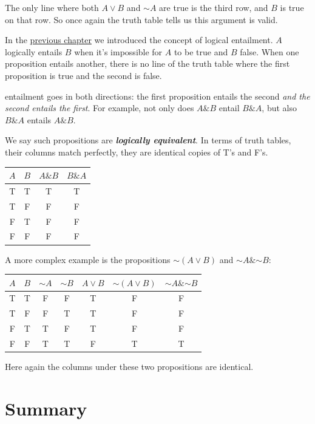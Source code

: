\documentclass[justified]{tufte-book}
\renewcommand{\neg}{\mathbin{\sim}}
\renewcommand{\wedge}{\mathbin{\&}}
\theoremstyle{definition}
\theoremstyle{definition}
\theoremstyle{definition}
\theoremstyle{definition}
\theoremstyle{remark}
\begin{document}
The only line where both \(A \vee B\) and \(\neg A\) are true is the third row, and \(B\) is true on that row. So once again the truth table tells us this argument is valid.

In the \protect\hyperlink{visualizing-propositions}{previous chapter} we introduced the concept of logical entailment. \(A\) logically entails \(B\) when it's impossible for \(A\) to be true and \(B\) false. When one proposition entails another, there is no line of the truth table where the first proposition is true and the second is false.

 entailment goes in both directions: the first proposition entails the second \emph{and the second entails the first}. For example, not only does \(A \wedge B\) entail \(B \wedge A\), but also \(B \wedge A\) entails \(A \wedge B\).

We say such propositions are \textbf{\emph{logically equivalent}}. In terms of truth tables, their columns match perfectly, they are identical copies of T's and F's.

\begin{longtable}[]{@{}cccc@{}}
\toprule
\(A\) & \(B\) & \(A \wedge B\) & \(B \wedge A\) \\
\midrule
\endhead
T & T & T & T \\
T & F & F & F \\
F & T & F & F \\
F & F & F & F \\
\bottomrule
\end{longtable}

A more complex example is the propositions \(\neg (A \vee B)\) and \(\neg A \wedge \neg B\):

\begin{longtable}[]{@{}ccccccc@{}}
\toprule
\(A\) & \(B\) & \(\neg A\) & \(\neg B\) & \(A \vee B\) & \(\neg(A \vee B)\) & \(\neg A \wedge \neg B\) \\
\midrule
\endhead
T & T & F & F & T & F & F \\
T & F & F & T & T & F & F \\
F & T & T & F & T & F & F \\
F & F & T & T & F & T & T \\
\bottomrule
\end{longtable}

Here again the columns under these two propositions are identical.

\hypertarget{summary}{%
\section{Summary}\label{summary}}
\end{document}
